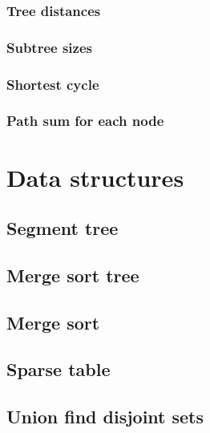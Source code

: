 \subsubsection{Tree distances}
\raggedbottom
\hrulefill
\subsubsection{Subtree sizes}
\raggedbottom
\hrulefill
\subsubsection{Shortest cycle}
\raggedbottom
\hrulefill
\subsubsection{Path sum for each node}
\raggedbottom
\hrulefill

\section{Data structures}
\subsection{Segment tree}
\raggedbottom
\hrulefill
\subsection{Merge sort tree}
\raggedbottom
\hrulefill
\subsection{Merge sort}
\raggedbottom
\hrulefill
\subsection{Sparse table}
\raggedbottom
\hrulefill
\subsection{Union find disjoint sets}
\raggedbottom
\hrulefill
